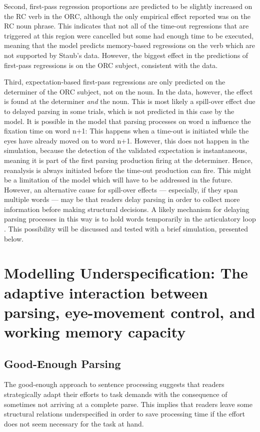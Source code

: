 \documentclass{cambridge7A}\usepackage[]{graphicx}\usepackage[]{color}
\begin{document}
Second, first-pass regression proportions are predicted to be slightly increased on the RC verb in the ORC, although the only empirical effect reported was on the RC noun phrase. This indicates that not all of the time-out regressions that are triggered at this region were cancelled but some had enough time to be executed, meaning that the model predicts memory-based regressions on the verb which are not supported by Staub's data. However, the biggest effect in the predictions of first-pass regressions is on the ORC subject, consistent with the data.

Third, expectation-based first-pass regressions are only predicted on the determiner of the ORC subject, not on the noun. In the data, however, the effect is found at the determiner \emph{and} the noun. This is most likely a spill-over effect due to delayed parsing in some trials, which is not predicted in this case by the model. It is possible in the model that parsing processes on word n influence the fixation time on word n+1: This happens when a time-out is initiated while the eyes have already moved on to word n+1. However, this does not happen in the simulation, because the detection of the validated expectation is instantaneous, meaning it is part of the first parsing production firing at the determiner. Hence, reanalysis is always initiated before the time-out production can fire. This might be a limitation of the model which will have to be addressed in the future. However, an alternative cause for spill-over effects --- especially, if they span multiple words --- may be that readers delay parsing in order to collect more information before making structural decisions.
A likely mechanism for delaying parsing processes in this way is to hold words temporarily in the articulatory loop \citep{BaddeleyHitch1974,Baddeley2003}. This possibility will be discussed and tested with a brief simulation, presented below. 

\section[Modelling Underspecification]{Modelling Underspecification: The adaptive interaction between parsing, eye-movement control, and working memory capacity}
\label{sec:sim:III}
\subsection{Good-Enough Parsing}
The good-enough approach to sentence processing \citep{FerreiraFerraroBailey2002,SanfordSturt2002} suggests that readers strategically adapt their efforts to task demands with the consequence of sometimes not arriving at a complete parse. 
This implies that readers leave some structural relations underspecified in order to save processing time if the effort does not seem necessary for the task at hand.
\end{document}
